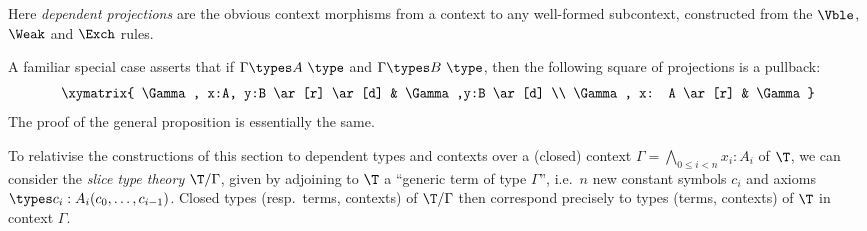 Here \emph{dependent projections} are the obvious context morphisms from a context to any well-formed subcontext, constructed from the $\Vble$, $\Weak$ and $\Exch$ rules.

A familiar special case asserts that if $\Gamma \types A\ \type$ and $\Gamma \types B\ \type$, then the following square of projections is a pullback:
\[\xymatrix{ \Gamma, x:A, y:B \ar[r] \ar[d] & \Gamma ,y:B \ar[d] \\
\Gamma , x: A \ar[r] & \Gamma } 
\]
The proof of the general proposition is essentially the same.

To relativise the constructions of this section to dependent types and contexts over a (closed) context $\Gamma = \bigwedge_{0 \leq i < n} x_i:A_i$ of $\T$, we can consider the \emph{slice type theory} $\T/\Gamma$, given by adjoining to $\T$ a ``generic term of type $\Gamma$'', i.e.\ $n$ new constant symbols $c_i$ and axioms $\types c_i : A_i(c_0,\ldots,c_{i-1})$.  Closed types (resp.\ terms, contexts) of $\T/\Gamma$ then correspond precisely to types (terms, contexts) of $\T$ in context $\Gamma$.


